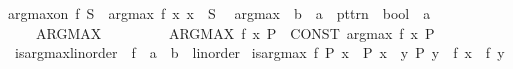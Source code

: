 \begin{isabellebody}
{\isachardoublequoteopen}arg{\isacharunderscore}{\kern0pt}max{\isacharunderscore}{\kern0pt}on\ f\ S\ {\isacharequal}{\kern0pt}\ arg{\isacharunderscore}{\kern0pt}max\ f\ {\isacharparenleft}{\kern0pt}{\isasymlambda}x{\isachardot}{\kern0pt}\ x\ {\isasymin}\ S{\isacharparenright}{\kern0pt}{\isachardoublequoteclose}\isanewline
\isanewline
{}\isamarkupfalse%
\isanewline
\isanewline
{}\isamarkupfalse%
\isanewline
\ \ {\isachardoublequoteopen}{\isacharunderscore}{\kern0pt}arg{\isacharunderscore}{\kern0pt}max{\isachardoublequoteclose}\ {\isacharcolon}{\kern0pt}{\isacharcolon}{\kern0pt}\ {\isachardoublequoteopen}{\isacharparenleft}{\kern0pt}{\isacharprime}{\kern0pt}b\ {\isasymRightarrow}\ {\isacharprime}{\kern0pt}a{\isacharparenright}{\kern0pt}\ {\isasymRightarrow}\ pttrn\ {\isasymRightarrow}\ bool\ {\isasymRightarrow}\ {\isacharprime}{\kern0pt}a{\isachardoublequoteclose}\isanewline
\ \ \ \ {\isacharparenleft}{\kern0pt}{\isachardoublequoteopen}{\isacharparenleft}{\kern0pt}{}ARG{\isacharprime}{\kern0pt}{\isacharunderscore}{\kern0pt}MAX\ {\isacharunderscore}{\kern0pt}\ {\isacharunderscore}{\kern0pt}{\isachardot}{\kern0pt}{\isacharslash}{\kern0pt}\ {\isacharunderscore}{\kern0pt}{\isacharparenright}{\kern0pt}{\isachardoublequoteclose}\ {\isacharbrackleft}{\kern0pt}{}{}{}{}{\isacharcomma}{\kern0pt}\ {}{\isacharcomma}{\kern0pt}\ {}{}{\isacharbrackright}{\kern0pt}\ {}{}{\isacharparenright}{\kern0pt}\isanewline
{}\isamarkupfalse%
\isanewline
\ \ {\isachardoublequoteopen}ARG{\isacharunderscore}{\kern0pt}MAX\ f\ x{\isachardot}{\kern0pt}\ P{\isachardoublequoteclose}\ {\isasymrightleftharpoons}\ {\isachardoublequoteopen}CONST\ arg{\isacharunderscore}{\kern0pt}max\ f\ {\isacharparenleft}{\kern0pt}{\isasymlambda}x{\isachardot}{\kern0pt}\ P{\isacharparenright}{\kern0pt}{\isachardoublequoteclose}\isanewline
\isanewline
{}\isamarkupfalse%
\ is{\isacharunderscore}{\kern0pt}arg{\isacharunderscore}{\kern0pt}max{\isacharunderscore}{\kern0pt}linorder{\isacharcolon}{\kern0pt}\ \ f\ {\isacharcolon}{\kern0pt}{\isacharcolon}{\kern0pt}\ {\isachardoublequoteopen}{\isacharprime}{\kern0pt}a\ {\isasymRightarrow}\ {\isacharprime}{\kern0pt}b\ {\isacharcolon}{\kern0pt}{\isacharcolon}{\kern0pt}\ linorder{\isachardoublequoteclose}\isanewline
{}\ {\isachardoublequoteopen}is{\isacharunderscore}{\kern0pt}arg{\isacharunderscore}{\kern0pt}max\ f\ P\ x\ {\isacharequal}{\kern0pt}\ {\isacharparenleft}{\kern0pt}P\ x\ {\isasymand}\ {\isacharparenleft}{\kern0pt}{\isasymforall}y{\isachardot}{\kern0pt}\ P\ y\ {\isasymlongrightarrow}\ f\ x\ {\isasymge}\ f\ y{\isacharparenright}{\kern0pt}{\isacharparenright}{\kern0pt}{\isachardoublequoteclose}\isanewline

\end{isabellebody}
